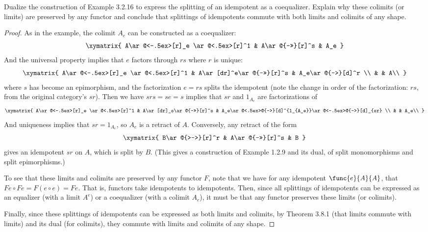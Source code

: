 \documentclass[main.tex]{subfiles}
\begin{document}
\begin{exercise}
	Dualize the construction of Example 3.2.16 to express the splitting of an
	idempotent as a coequalizer. Explain why these colimits (or limits) are
	preserved by any functor and conclude that splittings of idempotents commute
	with both limits and colimits of any shape.
\end{exercise}
\begin{proof}
	As in the example, the colimit $A_e$ can be constructed as a coequalizer:
	$$
	\xymatrix{
		A\ar@<-.5ex>[r]_e \ar@<.5ex>[r]^1 & A\ar@{->>}[r]^s & A_e
	}
	$$
	And the universal property implies that $e$ factors through $rs$ where $r$ is unique:
	$$
	\xymatrix{
		A\ar@<-.5ex>[r]_e \ar@<.5ex>[r]^1 & A\ar[dr]^e\ar@{->>}[r]^s & A_e\ar@{-->}[d]^r \\
		& & A\\
	}
	$$
	where $s$ has become an epimorphism, and the factorization $e=rs$ splits the idempotent (note the change in order of the factorization: $rs$, from the original category's $sr$). Then we have $srs = se = s$ implies that $sr$ and $1_{A_e}$ are factorizations of
	$$
	\xymatrix{
		A\ar@<-.5ex>[r]_e \ar@<.5ex>[r]^1 & A\ar[dr]_s\ar@{->>}[r]^s & A_e\ar@<.5ex>@{-->}[d]^{1_{A_e}}\ar@<-.5ex>@{-->}[d]_{sr} \\
		& & A_e\\
	}
	$$
	And uniqueness implies that $sr = 1_{A_e}$, so $A_e$ is a retract of $A$. Conversely, any retract of the form
	$$
	\xymatrix{
		B\ar@{>->}[r]^r & A\ar@{->>}[r]^s & B
	}
	$$
	gives an idempotent $sr$ on $A$, which is split by $B$. (This gives a
	construction of Example 1.2.9 and its dual, of split monomorphisms and split
	epimorphisms.)

	To see that these limits and colimits are preserved by any functor $F$, note
	that we have for any idempotent $\func{e}{A}{A}$, that $Fe\circ Fe =
	F(e\circ e) = Fe$. That is, functors take idempotents to idempotents. Then,
	since all splittings of idempotents can be expressed as an equalizer (with a
	limit $A^e$) or a coequalizer (with a colimit $A_e$), it must be that any
	functor preserves these limits (or colimits).

	Finally, since these splittings of idempotents can be expressed as both
	limits and colimits, by Theorem 3.8.1 (that limits commute with limits) and
	its dual (for colimits), they commute with limits and colimits of any shape.
\end{proof}
\end{document}
